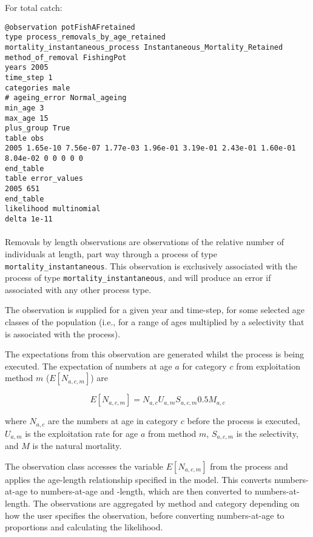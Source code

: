 \begin{itemize}
For total catch:

{\small{\begin{verbatim}
@observation potFishAFretained
type process_removals_by_age_retained
mortality_instantaneous_process Instantaneous_Mortality_Retained
method_of_removal FishingPot
years 2005
time_step 1
categories male
# ageing_error Normal_ageing
min_age 3
max_age 15
plus_group True
table obs
2005 1.65e-10 7.56e-07 1.77e-03 1.96e-01 3.19e-01 2.43e-01 1.60e-01 8.04e-02 0 0 0 0 0
end_table
table error_values
2005 651
end_table
likelihood multinomial
delta 1e-11
\end{verbatim}}}

\paragraph*{\label{sec:removals-by-length}}\label{sec:Observation-ProcessRemovalsByLength}

Removals by length observations are observations of the relative number of individuals at length, part way through a process of type \texttt{mortality\_instantaneous}. This observation is exclusively associated with the process of type \texttt{mortality\_instantaneous}, and will produce an error if associated with any other process type.

The observation is supplied for a given year and time-step, for some selected age classes of the population (i.e., for a range of ages multiplied by a selectivity that is associated with the process).

The expectations from this observation are generated whilst the process is being executed. The expectation of numbers at age $a$ for category $c$ from exploitation method $m$ ($E[N_{a,c,m}]$) are

\begin{equation}
E[N_{a,c,m}] = N_{a,c} U_{a,m} S_{a,c,m} 0.5 M_{a,c}
\end{equation}

where $N_{a,c}$ are the numbers at age in category $c$ before the process is executed, $U_{a,m}$ is the exploitation rate for age $a$ from method $m$, $S_{a,c,m}$ is the selectivity, and $M$ is the natural mortality.

The observation class accesses the variable $E[N_{a,c,m}]$ from the process and applies the age-length relationship specified in the model. This converts numbers-at-age to numbers-at-age and -length, which are then converted to numbers-at-length. The observations are aggregated by method and category depending on how the user specifies the observation, before converting numbers-at-age to proportions and calculating the likelihood.


\end{itemize}
